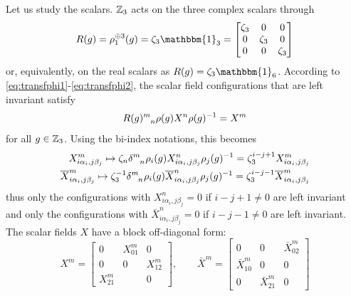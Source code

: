             Let us study the scalars. $\mathbb{Z}_3$ acts on the three complex scalars through
            \begin{equation}
                R(g)= \rho^{\oplus 3}_1(g) = \zeta_3\mathbbm{1}_3 =
                \begin{bmatrix}
                    \zeta_3 & 0 & 0 \\
                    0 & \zeta_3 & 0 \\
                    0 & 0 & \zeta_3
                \end{bmatrix}
            \end{equation}
            or, equivalently, on the real scalars as $R(g)=\zeta_3\mathbbm{1}_6$. According to \eqref{eq:transfphi1}-\eqref{eq:transfphi2}, the scalar field configurations that are left invariant satisfy
            \begin{equation}
                R(g)\indices{^m_n}\rho(g)X^n\rho(g)^{-1}=X^m
            \end{equation}
            for all $g\in\mathbb{Z}_3$. Using the bi-index notations, this becomes
            \begin{align}
                X^m_{i\alpha_i,j\beta_j}\mapsto  \zeta_n\delta\indices{^m_n}\rho_i(g) X^n_{i\alpha_i,j\beta_j}\rho_j(g)^{-1} = \zeta^{i-j+1}_3X^m_{i\alpha_i,j\beta_j}\\
                \bar{X}^m_{i\alpha_i,j\beta_j}\mapsto  \zeta^{-1}_3\delta\indices{^m_n}\rho_i(g) \bar{X}^n_{i\alpha_i,j\beta_j}\rho_j(g)^{-1} = \zeta^{i-j-1}_3\bar{X}^m_{i\alpha_i,j\beta_j}
            \end{align}
            thus only the configurations with $X^n_{i\alpha_i,j\beta_j}=0$ if $i-j+1\neq0$ are left invariant and only the configurations with $\bar{X}^n_{i\alpha_i,j\beta_j}=0$ if $i-j-1\neq0$ are left invariant. The scalar fields $X$ have a block off-diagonal form:
            \begin{equation}
                X^m=
                \begin{bmatrix}
                    0 & X^m_{01} & 0 \\
                    0 & 0 & X^m_{12} \\
                    X^m_{21} & & 0
                \end{bmatrix},\qquad
                \bar{X}^m=
                \begin{bmatrix}
                    0 & 0 & \bar{X}^m_{02} \\
                    \bar{X}^m_{10} & 0 & 0 \\
                    0 & \bar{X}^m_{21} & 0
                \end{bmatrix}
            \end{equation}
